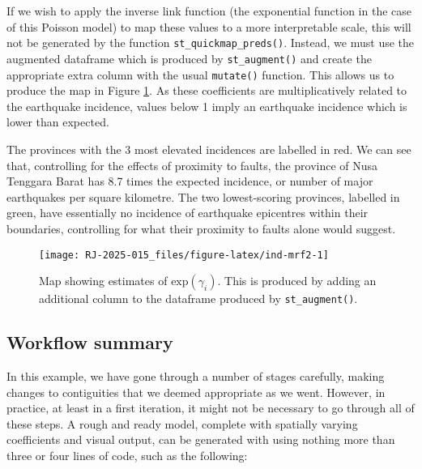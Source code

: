 If we wish to apply the inverse link function (the exponential function in the case of this Poisson model) to map these values to a more interpretable scale, this will not be generated by the function \texttt{st\_quickmap\_preds()}. Instead, we must use the augmented dataframe which is produced by \texttt{st\_augment()} and create the appropriate extra column with the usual  \texttt{mutate()} function. This allows us to produce the map in Figure
\ref{fig:ind-mrf2}. As these coefficients are multiplicatively related to the earthquake incidence, values below 1 imply an earthquake incidence which is lower than expected.

The provinces with the 3 most elevated incidences are labelled in red. We can see that, controlling for the effects of proximity to faults, the province of Nusa Tenggara Barat has 8.7 times the expected incidence, or number of major earthquakes per square kilometre. The two lowest-scoring provinces, labelled in green, have essentially no incidence of earthquake epicentres within their boundaries, controlling for what their proximity to faults alone would suggest.



\begin{figure}

{\centering \texttt{[image: RJ-2025-015\_files/figure-latex/ind-mrf2-1]} 

}

\caption{Map showing estimates of \(\text{exp}(\gamma_i).\) This is produced by adding an additional column to the dataframe produced by \texttt{st\_augment()}.}\label{fig:ind-mrf2}
\end{figure}

\subsection{Workflow summary}\label{workflow-summary}

In this example, we have gone through a number of stages carefully, making changes to contiguities that we deemed appropriate as we went. However, in practice, at least in a first iteration, it might not be necessary to go through all of these steps. A rough and ready model, complete with spatially varying coefficients and visual output, can be generated with  using nothing more than three or four lines of code, such as the following:


